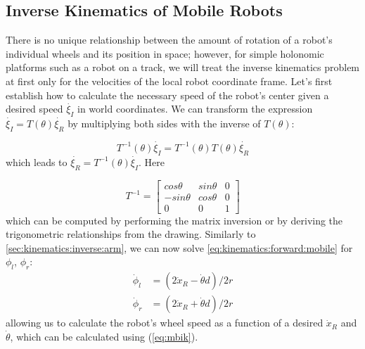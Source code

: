 \subsection{Inverse Kinematics of Mobile Robots}\label{sec:kinematics:ik:mobile}

There is no unique relationship between the amount of rotation of a robot's individual wheels and its position in space; however, for simple holonomic platforms such as a robot on a track, we will treat the inverse kinematics problem at first only for the velocities of the local robot coordinate frame.
%
Let's first establish how to calculate the necessary speed of the robot's center given a desired speed $ \dot{\xi_I}$ in world coordinates. We can transform the expression $ \dot{\xi_I}=T(\theta)\dot{\xi_R}$ by multiplying both sides with the inverse of $ T(\theta)$:

\begin{equation}\label{eq:mbik}
T^{-1}(\theta)\dot{\xi_I}=T^{-1}(\theta)T(\theta)\dot{\xi_R}
\end{equation}
which leads to $ \dot{\xi_R}=T^{-1}(\theta)\dot{\xi_I}$. Here

\begin{equation}
T^{-1}=\left[\begin{array}{ccc}cos \theta & sin \theta & 0 \\ -sin \theta & cos \theta & 0 \\ 0 & 0 & 1\end{array}\right]
\end{equation}
which can be computed by performing the matrix inversion or by deriving the trigonometric relationships from the drawing.  Similarly to \cref{sec:kinematics:inverse:arm}, we can now solve \cref{eq:kinematics:forward:mobile}
for $ \phi_l$, $ \phi_r$:
\begin{eqnarray}
\dot{\phi}_l &= (2\dot{x}_R - \dot{\theta}d)/2r\\
\nonumber
\dot{\phi}_r &= (2\dot{x}_R + \dot{\theta}d)/2r
\end{eqnarray}
allowing us to calculate the robot's wheel speed as a function of a desired $\dot{x}_R$ and $\dot{\theta}$, which can be calculated using (\ref{eq:mbik}).

